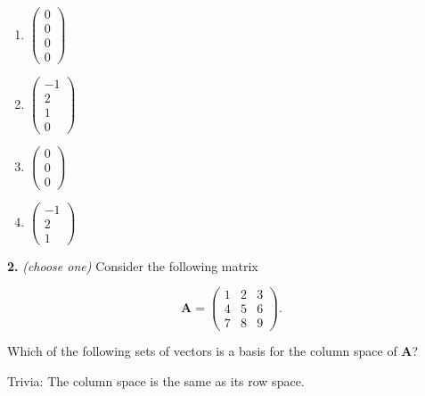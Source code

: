 \documentclass[10pt,a4paper]{article}
\begin{document}
\begin{enumerate}[label=(\Alph*)]
\item \(\begin{pmatrix}0\\0\\0\\0\end{pmatrix}\)
\item \(\begin{pmatrix}-1\\2\\1\\0\end{pmatrix}\)
\item \(\begin{pmatrix}0\\0\\0\end{pmatrix}\)
\item \(\begin{pmatrix}-1\\2\\1\end{pmatrix}\)
\end{enumerate}
\smallskip
\textbf{2.} \textit{(choose one)} Consider the following matrix

\[\mathbf{A}=\begin{pmatrix}1&2&3\\4&5&6\\7&8&9\end{pmatrix}.\]

Which of the following sets of vectors is a basis for the column space of \(\mathbf{A}\)?

Trivia: The column space is the same as its row space.
\end{document}

